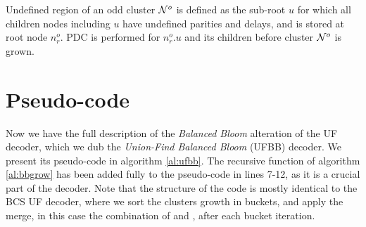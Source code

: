 \begin{theorem}\label{the:delayonce}
  Undefined region of an odd cluster $\mathcal{N}^o$ is defined as the sub-root $u$ for which all children nodes including $u$ have undefined parities and delays, and is stored at root node $n^o_r$. PDC is performed for $n^o_r.u$ and its children before cluster $\mathcal{N}^o$ is grown.
\end{theorem}

\section{Pseudo-code}
Now we have the full description of the \emph{Balanced Bloom} alteration of the UF decoder, which we dub the \emph{Union-Find Balanced Bloom} (UFBB) decoder. We present its pseudo-code in algorithm \ref{al:ufbb}. The recursive  function of algorithm \ref{al:bbgrow} has been added fully to the pseudo-code in lines 7-12, as it is a crucial part of the decoder. Note that the structure of the code is mostly identical to the BCS UF decoder, where we sort the clusters growth in buckets, and apply the merge, in this case the combination of  and , after each bucket iteration.

\begin{algo}[algotitle=Union-Find Balanced Bloom (UFBB), label=al:ufbb]
\begin{algorithm}[H]

\KwData{\buckets}

\BlankLine

\end{algorithm}
\end{algo}


